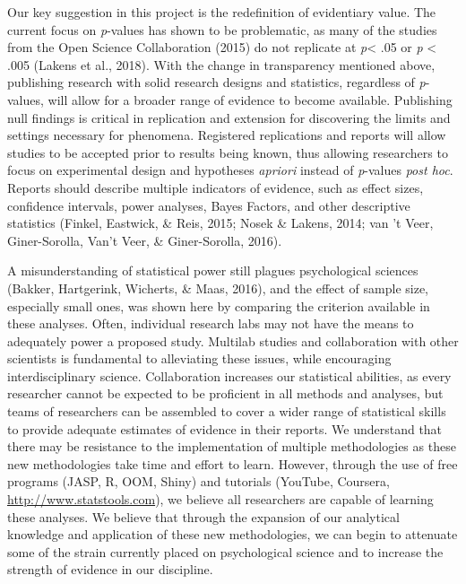 \documentclass[english,man]{apa6}
\theoremstyle{definition}
\theoremstyle{definition}
\theoremstyle{definition}
\theoremstyle{remark}
\begin{document}
Our key suggestion in this project is the redefinition of evidentiary
value. The current focus on \emph{p}-values has shown to be problematic,
as many of the studies from the Open Science Collaboration (2015) do not
replicate at \emph{p}\textless{} .05 or \emph{p} \textless{} .005
(Lakens et al., 2018). With the change in transparency mentioned above,
publishing research with solid research designs and statistics,
regardless of \emph{p}-values, will allow for a broader range of
evidence to become available. Publishing null findings is critical in
replication and extension for discovering the limits and settings
necessary for phenomena. Registered replications and reports will allow
studies to be accepted prior to results being known, thus allowing
researchers to focus on experimental design and hypotheses
\emph{apriori} instead of \emph{p}-values \emph{post hoc}. Reports
should describe multiple indicators of evidence, such as effect sizes,
confidence intervals, power analyses, Bayes Factors, and other
descriptive statistics (Finkel, Eastwick, \& Reis, 2015; Nosek \&
Lakens, 2014; van 't Veer, Giner-Sorolla, Van't Veer, \& Giner-Sorolla,
2016).

A misunderstanding of statistical power still plagues psychological
sciences (Bakker, Hartgerink, Wicherts, \& Maas, 2016), and the effect
of sample size, especially small ones, was shown here by comparing the
criterion available in these analyses. Often, individual research labs
may not have the means to adequately power a proposed study. Multilab
studies and collaboration with other scientists is fundamental to
alleviating these issues, while encouraging interdisciplinary science.
Collaboration increases our statistical abilities, as every researcher
cannot be expected to be proficient in all methods and analyses, but
teams of researchers can be assembled to cover a wider range of
statistical skills to provide adequate estimates of evidence in their
reports. We understand that there may be resistance to the
implementation of multiple methodologies as these new methodologies take
time and effort to learn. However, through the use of free programs
(JASP, R, OOM, Shiny) and tutorials (YouTube, Coursera,
\url{http://www.statstools.com}), we believe all researchers are capable
of learning these analyses. We believe that through the expansion of our
analytical knowledge and application of these new methodologies, we can
begin to attenuate some of the strain currently placed on psychological
science and to increase the strength of evidence in our discipline.
\end{document}

